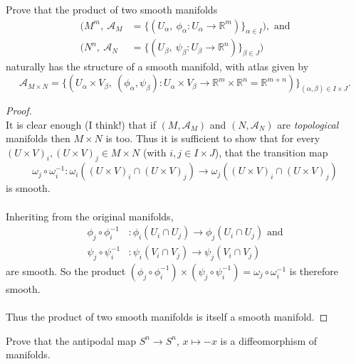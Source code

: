 \documentclass{article}
\newenvironment{problem}[2][Problem]{\begin{trivlist}
\item[\hskip \labelsep {\bfseries #1}\hskip \labelsep {\bfseries #2.}]}{\end{trivlist}}
\begin{document}
\begin{problem}{3}
  Prove that the product of two smooth manifolds \begin{align*}
    (M^m,\ \mathcal{A}_M &= \{(U_\alpha,\ \phi_\alpha: U_\alpha \rightarrow \mathbb{R}^m)\}_{\alpha \in I}), \text{ and}\\
    (N^n,\ \mathcal{A}_N &= \{(U_\beta,\ \psi_\beta: U_\beta \rightarrow \mathbb{R}^n)\}_{\beta \in J})
  \end{align*}
  naturally has the structure of a smooth manifold, with atlas given by \[
    \mathcal{A}_{M\times N} = \{
      (U_\alpha \times V_\beta,\
      (\phi_\alpha, \psi_\beta):
        U_\alpha \times V_\beta \rightarrow
        \mathbb{R}^m \times \mathbb{R}^n = \mathbb{R}^{m + n})
    \}_{(\alpha, \beta) \in I \times J}.
  \]

\end{problem}

\begin{proof} \text{} \\
  It is clear enough (I think!) that if $(M, \mathcal{A}_M)$ and
  $(N, \mathcal{A}_N)$ are \textit{topological} manifolds then $M \times N$ is too.
  Thus it is sufficient to show that for every
  $(U \times V)_i, (U \times V)_j \in M \times N$ (with $i, j \in I \times J$),
  that the transition map
  \[
    \omega_j \circ \omega_i^{-1}:\omega_i((U \times V)_i \cap (U \times V)_j) \rightarrow \omega_j((U \times V)_i \cap (U \times V)_j)
  \] is smooth.\\
  \\
  Inheriting from the original manifolds, \begin{align*}
    \phi_j \circ \phi_i^{-1}&:\phi_i(U_i \cap U_j) \rightarrow \phi_j(U_i \cap U_j) \text{ and}\\
    \psi_j \circ \psi_i^{-1}&:\psi_i(V_i \cap V_j) \rightarrow \psi_j(V_i \cap V_j)
  \end{align*} are smooth. So the product $(\phi_j \circ \phi_i^{-1}) \times (\psi_j \circ \psi_i^{-1}) = \omega_j \circ \omega_i^{-1}$
  is therefore smooth.\\
  \\
  Thus the product of two smooth manifolds is itself a smooth manifold.
\end{proof}

\pagebreak

\begin{problem}{4}
  Prove that the antipodal map $S^n \rightarrow S^n$, $x \mapsto -x$ is a
  diffeomorphism of manifolds.
\end{problem}
\end{document}
